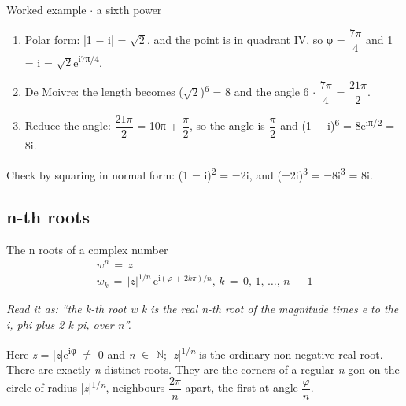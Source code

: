 \documentclass[11pt]{article}
\begin{document}
\begin{keepsection}
\begin{keepsection}
\begin{workedbox}{Worked example \ensuremath{\cdot} a sixth power}
\begin{enumerate}
\item Polar form: |1 \ensuremath{-} i| = \ensuremath{\sqrt{2}}, and the point is in quadrant IV, so φ = {\small\ensuremath{\dfrac{7π}{4}}} and 1 \ensuremath{-} i = \ensuremath{\sqrt{2}}e\textsuperscript{i7π/4}.
\item De Moivre: the length becomes (\ensuremath{\sqrt{2}})\textsuperscript{6} = 8 and the angle 6 \ensuremath{\cdot} {\small\ensuremath{\dfrac{7π}{4}}} = {\small\ensuremath{\dfrac{21π}{2}}}.
\item Reduce the angle: {\small\ensuremath{\dfrac{21π}{2}}} = 10π + {\small\ensuremath{\dfrac{π}{2}}}, so the angle is {\small\ensuremath{\dfrac{π}{2}}} and (1 \ensuremath{-} i)\textsuperscript{6} = 8e\textsuperscript{iπ/2} = 8i.
\end{enumerate}

Check by squaring in normal form: (1 \ensuremath{-} i)\textsuperscript{2} = \ensuremath{-}2i, and (\ensuremath{-}2i)\textsuperscript{3} = \ensuremath{-}8i\textsuperscript{3} = 8i.
\end{workedbox}
\end{keepsection}

\begin{keepsection}
\subsection{n-th roots}

\begin{equationcard}{The n roots of a complex number}
\[ \begin{gathered} {w}^{{n}}\, =\, {z} \\ {w}_{{k}}\, =\, |{z}|^{1/{n}}\, \mathrm{e}^{\mathrm{i}(φ\, +\, 2{k}π)/{n}},\, {k}\, =\, 0,\, 1,\, …,\, {n}\, -\, 1 \end{gathered} \]
{\small \emph{Read it as: “the k-th root w k is the real n-th root of the magnitude times e to the i, phi plus 2 k pi, over n”.}\par Here \textit{z} = |\textit{z}|e\textsuperscript{iφ} \ensuremath{\neq} 0 and \textit{n} \ensuremath{\in} \ensuremath{\mathbb{N}}; |\textit{z}|\textsuperscript{1/\textit{n}} is the ordinary non-negative real root. There are exactly \textit{n} distinct roots. They are the corners of a regular \textit{n}-gon on the circle of radius |\textit{z}|\textsuperscript{1/\textit{n}}, neighbours {\small\ensuremath{\dfrac{2π}{{n}}}} apart, the first at angle {\small\ensuremath{\dfrac{φ}{{n}}}}.}
\end{equationcard}


\end{keepsection}
\end{keepsection}
\end{document}
